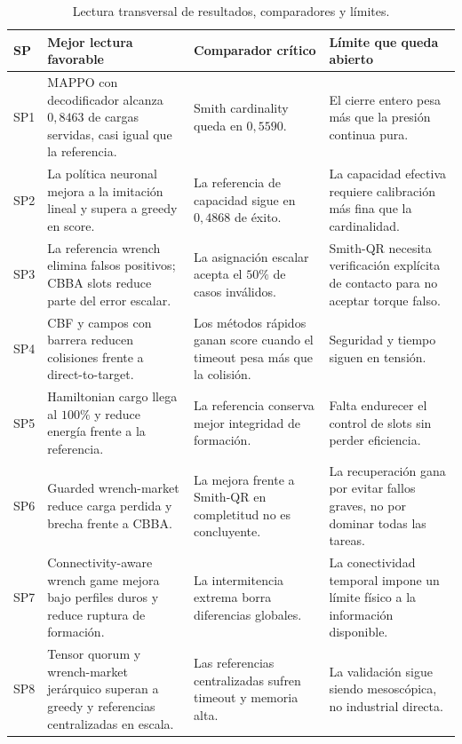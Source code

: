 \begin{table}[H]
\centering
\scriptsize
\begin{tabularx}{\textwidth}{@{}p{}p{}p{}X@{}}
\toprule
SP & Mejor lectura favorable & Comparador crítico & Límite que queda abierto \\
\midrule
SP1 & MAPPO con decodificador alcanza $0{,}8463$ de cargas servidas, casi igual que la referencia. & Smith cardinality queda en $0{,}5590$. & El cierre entero pesa más que la presión continua pura. \\
SP2 & La política neuronal mejora a la imitación lineal y supera a greedy en score. & La referencia de capacidad sigue en $0{,}4868$ de éxito. & La capacidad efectiva requiere calibración más fina que la cardinalidad. \\
SP3 & La referencia wrench elimina falsos positivos; CBBA slots reduce parte del error escalar. & La asignación escalar acepta el $50\%$ de casos inválidos. & Smith-QR necesita verificación explícita de contacto para no aceptar torque falso. \\
SP4 & CBF y campos con barrera reducen colisiones frente a direct-to-target. & Los métodos rápidos ganan score cuando el timeout pesa más que la colisión. & Seguridad y tiempo siguen en tensión. \\
SP5 & Hamiltonian cargo llega al $100\%$ y reduce energía frente a la referencia. & La referencia conserva mejor integridad de formación. & Falta endurecer el control de slots sin perder eficiencia. \\
SP6 & Guarded wrench-market reduce carga perdida y brecha frente a CBBA. & La mejora frente a Smith-QR en completitud no es concluyente. & La recuperación gana por evitar fallos graves, no por dominar todas las tareas. \\
SP7 & Connectivity-aware wrench game mejora bajo perfiles duros y reduce ruptura de formación. & La intermitencia extrema borra diferencias globales. & La conectividad temporal impone un límite físico a la información disponible. \\
SP8 & Tensor quorum y wrench-market jerárquico superan a greedy y referencias centralizadas en escala. & Las referencias centralizadas sufren timeout y memoria alta. & La validación sigue siendo mesoscópica, no industrial directa. \\
\bottomrule
\end{tabularx}
\caption{Lectura transversal de resultados, comparadores y límites.}
\label{tab:lectura-transversal-resultados}
\end{table}

